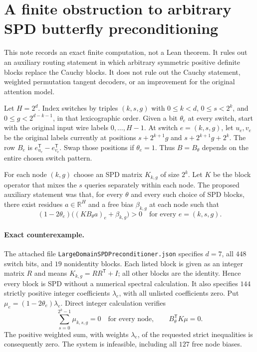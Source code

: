\documentclass{article}
\begin{document}
\section*{A finite obstruction to arbitrary SPD butterfly preconditioning}

This note records an exact finite computation, not a Lean theorem. It rules out
an auxiliary routing statement in which arbitrary symmetric positive definite
blocks replace the Cauchy blocks. It does not rule out the Cauchy statement,
weighted permutation tangent decoders, or an improvement for the original
attention model.

Let $H=2^d$. Index switches by triples $(k,s,g)$ with
$0\leq k<d$, $0\leq s<2^k$, and $0\leq g<2^{d-k-1}$, in that lexicographic
order. Given a bit $\theta_e$ at every switch, start with the original input
wire labels $0,\ldots,H-1$. At switch $e=(k,s,g)$, let $u_e,v_e$ be the
original labels currently at positions $s+2^{k+1}g$ and
$s+2^{k+1}g+2^k$. The row $B_e$ is $e_{u_e}^{\mathsf T}-e_{v_e}^{\mathsf T}$.
Swap those positions if $\theta_e=1$. Thus $B=B_\theta$ depends on the entire
chosen switch pattern.

For each node $(k,g)$ choose an SPD matrix $K_{k,g}$ of size $2^k$. Let $K$ be
the block operator that mixes the $s$ queries separately within each node.
The proposed auxiliary statement was that, for every $\theta$ and every such
choice of SPD blocks, there exist residues $a\in\mathbb R^H$ and a free bias
$\beta_{k,g}$ at each node such that
\[
 (1-2\theta_e)\bigl((KB_\theta a)_e+\beta_{k,g}\bigr)>0
 \quad\text{for every }e=(k,s,g).
\]

\paragraph{Exact counterexample.}
The attached file \texttt{LargeDomainSPDPreconditioner.json} specifies $d=7$,
all $448$ switch bits, and $19$ nonidentity blocks. Each listed block is given
as an integer matrix $R$ and means $K_{k,g}=RR^{\mathsf T}+I$; all other
blocks are the identity. Hence every block is SPD without a numerical spectral
calculation. It also specifies $144$ strictly positive integer coefficients
$\lambda_e$, with all unlisted coefficients zero. Put
$\mu_e=(1-2\theta_e)\lambda_e$. Direct integer calculation verifies
\[
 \sum_{s=0}^{2^k-1}\mu_{k,s,g}=0
 \quad\text{for every node},
 \qquad B_\theta^{\mathsf T}K\mu=0.
\]
The positive weighted sum, with weights $\lambda_e$, of the requested strict
inequalities is consequently zero. The system is infeasible, including all
$127$ free node biases.
\end{document}
